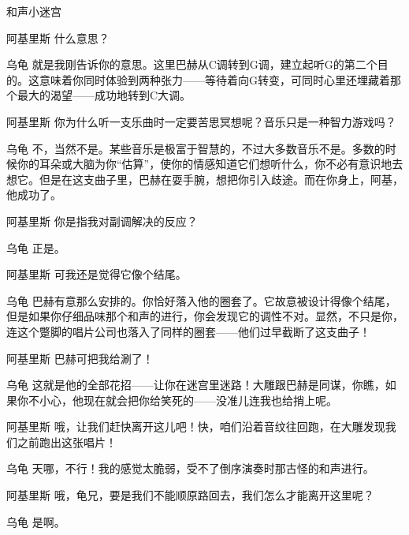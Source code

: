 \begin{dialog}{和声小迷宫}
\begin{dialogue}
\begin{dialogue}
\begin{dialogue}
\begin{dialogue}
      \item[阿基里斯]什么意思？

      \item[乌龟]就是我刚告诉你的意思。这里巴赫从C调转到G调，建立起听G的第二个目的。这意味着你同时体验到两种张力——等待着向G转变，可同时心里还埋藏着那个最大的渴望——成功地转到C大调。

      \item[阿基里斯]你为什么听一支乐曲时一定要苦思冥想呢？音乐只是一种智力游戏吗？

      \item[乌龟]不，当然不是。某些音乐是极富于智慧的，不过大多数音乐不是。多数的时候你的耳朵或大脑为你“估算”，使你的情感知道它们想听什么，你不必有意识地去想它。但是在这支曲子里，巴赫在耍手腕，想把你引入歧途。而在你身上，阿基，他成功了。

      \item[阿基里斯]你是指我对副调解决的反应？

      \item[乌龟]正是。

      \item[阿基里斯]可我还是觉得它像个结尾。

      \item[乌龟]巴赫有意那么安排的。你恰好落入他的圈套了。它故意被设计得像个结尾，但是如果你仔细品味那个和声的进行，你会发现它的调性不对。显然，不只是你，连这个蹩脚的唱片公司也落入了同样的圈套——他们过早截断了这支曲子！

      \item[阿基里斯]巴赫可把我给涮了！

      \item[乌龟]这就是他的全部花招——让你在迷宫里迷路！大雕跟巴赫是同谋，你瞧，如果你不小心，他现在就会把你给笑死的——没准儿连我也给捎上呢。

      \item[阿基里斯]哦，让我们赶快离开这儿吧！快，咱们沿着音纹往回跑，在大雕发现我们之前跑出这张唱片！

      \item[乌龟]天哪，不行！我的感觉太脆弱，受不了倒序演奏时那古怪的和声进行。

      \item[阿基里斯]哦，龟兄，要是我们不能顺原路回去，我们怎么才能离开这里呢？

      \item[乌龟]是啊。



\end{dialogue}
\end{dialogue}
\end{dialogue}
\end{dialogue}
\end{dialog}

